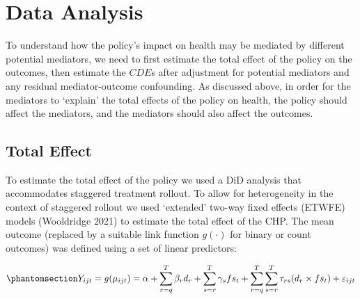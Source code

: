 \documentclass[
  letterpaper,
  DIV=11,
  numbers=noendperiod]{scrartcl}
\begin{document}
\section{Data Analysis}\label{data-analysis}

To understand how the policy's impact on health may be mediated by
different potential mediators, we need to first estimate the total
effect of the policy on the outcomes, then estimate the \(CDE\)s after
adjustment for potential mediators and any residual mediator-outcome
confounding. As discussed above, in order for the mediators to `explain'
the total effects of the policy on health, the policy should affect the
mediators, and the mediators should also affect the outcomes.

\subsection{Total Effect}\label{total-effect}

To estimate the total effect of the policy we used a DiD analysis that
accommodates staggered treatment rollout. To allow for heterogeneity in
the context of staggered rollout we used `extended' two-way fixed
effects (ETWFE) models (Wooldridge 2021) to estimate the total effect of
the CHP. The mean outcome (replaced by a suitable link function
\(g(\cdot)\) for binary or count outcomes) was defined using a set of
linear predictors:

\begin{equation}\phantomsection\label{eq-etwfe}{Y_{ijt}=g(\mu_{ijt}) = \alpha + \sum_{r=q}^{T} \beta_{r} d_{r} + \sum_{s=r}^{T} \gamma_{s} fs_{t}+ \sum_{r=q}^{T} \sum_{s=r}^{T} \tau_{rs} (d_{r} \times fs_{t}) + \varepsilon_{ijt}}\end{equation}
\end{document}
